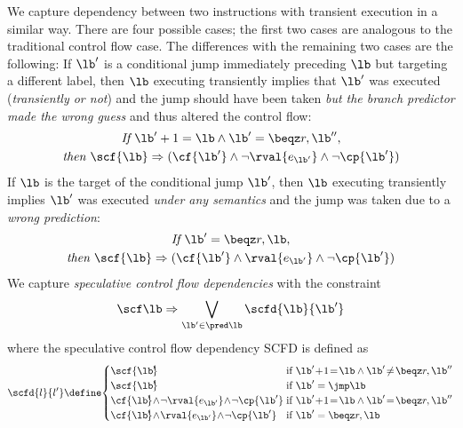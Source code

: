 \documentclass[conference]{IEEEtran}
\begin{document}
We capture dependency between two instructions with transient execution in a similar way.
There are four possible cases; the first two cases are analogous to the traditional control flow case.
The differences with the remaining two cases are the following:
  If $\lb'$ is a conditional jump immediately preceding $\lb$ but targeting a different label, then $\lb$ executing transiently implies that $\lb'$ was executed (\emph{transiently or not}) and the jump should have been taken \emph{but the branch predictor made the wrong guess} and thus altered the control flow:
  \begin{gather*}
    \textit{If }\lb'+1 = \lb \land \lb' = \beqz r,\lb'',\\
    \textit{then } \scf{\lb} \Rightarrow ({{\cf{\lb'}} \land \neg \rval{e_{\lb'}}} \land {\neg \cp{\lb'}})
  \end{gather*}
  If $\lb$ is the target of the conditional jump $\lb'$, then $\lb$ executing transiently implies $\lb'$ was executed \emph{under any semantics} and the jump was taken due to a \emph{wrong prediction}:
  \begin{gather*}
  \textit{If }\lb' = \beqz r,\lb,\\
  \textit{then } \scf{\lb} \Rightarrow ({\cf{\lb'} \land {\rval{e_{\lb'}}}} \land \neg \cp{\lb'})
  \end{gather*}
We capture \emph{speculative control flow dependencies} with the constraint
\begin{equation}
\label{eq:scf}
{\scf \lb} \Rightarrow {\bigvee\limits_{{\lb'} \in \pred \lb} \scfd{\lb}{\lb'}}
\end{equation}
where the speculative control flow dependency \textsc{SCFD} is defined as
{\small
\[   
\scfd{l}{l'} \define \!
     \begin{cases}
       \scf{\lb'\!\!} & \hspace*{-2.5mm}\text{if } \lb' \! + \! 1 \!=\! \lb \land \lb' \! \neq \! \beqz r,\lb'' \\
       \scf{\lb'\!\!} & \hspace*{-2.5mm}\text{if } \lb' = \jmp \lb \\
       {{\cf{\lb'\!\!}} \! \land \! \neg \rval{e_{\lb'}}} \! \land \! {\neg \cp{\lb'}} & \hspace*{-2.5mm}\text{if } \lb' \! + \! 1\! = \! \lb \land \lb' \! = \! \beqz r,\lb'' \\
       {{\cf{\lb'\!\!}} \! \land \! {\rval{e_{\lb'}}}} \! \land \! {\neg \cp{\lb'}} & \hspace*{-2.5mm} \text{if } \lb' = \beqz r,\lb \\
     \end{cases}
\]}
\end{document}
